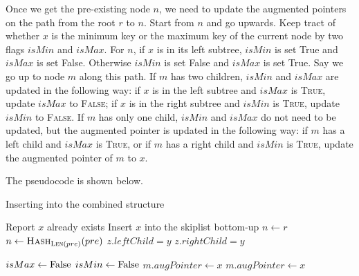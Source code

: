 \documentclass{article}
\begin{document}
Once we get the pre-existing node $n$, we need to update the augmented pointers on the path from the root $r$ to $n$. Start from $n$ and go upwards. Keep tract of whether $x$ is the minimum key or the maximum key of the current node by two flags $isMin$ and $isMax$. For $n$, if $x$ is in its left subtree, $isMin$ is set True and $isMax$ is set False. Otherwise $isMin$ is set False and $isMax$ is set True. Say we go up to node $m$ along this path. If $m$ has two children, $isMin$ and $isMax$ are updated in the following way: if $x$ is in the left subtree and $isMax$ is \textsc{True}, update $isMax$ to \textsc{False}; if $x$ is in the right subtree and $isMin$ is \textsc{True}, update $isMin$ to \textsc{False}. If $m$ has only one child, $isMin$ and $isMax$ do not need to be updated, but the augmented pointer is updated in the following way: if $m$ has a left child and $isMax$ is \textsc{True}, or if $m$ has a right child and $isMin$ is \textsc{True}, update the augmented pointer of $m$ to $x$.

The pseudocode is shown below.
\begin{algorithm}
\caption{Inserting into the combined structure}
\begin{algorithmic}[1]
 {Report $x$ already exists}
\Else{} {Insert $x$ into the skiplist bottom-up}
\EndIf
{}
		 {$n\gets r$}
		\Else{} {$n\gets\textsc{Hash}_{\textsc{Len}(pre)}(pre)$}
		\EndIf
			 {$z.leftChild=y$}
			\Else{} {$z.rightChild=y$}
			
			\EndIf
		\EndIf
	\EndWhile
	\Else{}
	\EndIf
			 {$isMax\gets\textup{False}$}
			 {$isMin\gets\textup{False}$}
			\EndIf
		\Else{}
			 {$m.augPointer\gets x$}
			 {$m.augPointer\gets x$}
			\EndIf
		\EndIf
	\EndWhile
\EndIf
\EndProcedure
\end{algorithmic}
\end{algorithm}
\end{document}
